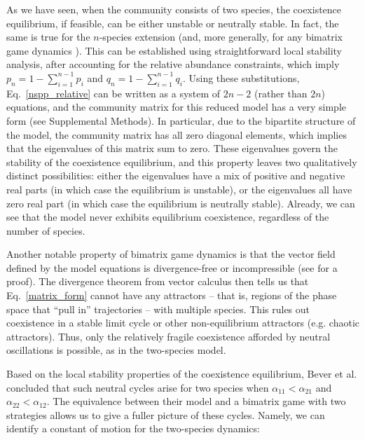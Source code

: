 \documentclass[11pt]{article}
\begin{document}
As we have seen, when the community consists of two species, the coexistence equilibrium, if feasible, can be either unstable or neutrally stable. In fact, the same is true for the $n$-species extension (and, more generally, for any bimatrix game dynamics \citep{eshel1983coevolutionary,selten1988note,hofbauer1998evolutionary}). This can be established using straightforward local stability analysis, after accounting for the relative abundance constraints, which imply $p_n = 1 - \sum_{i = 1}^{n-1} p_i$ and $q_n = 1 - \sum_{i = 1}^{n-1} q_i$. Using these substitutions, Eq.~\ref{nspp_relative} can be written as a system of $2 n - 2$ (rather than $2 n$) equations, and the community matrix for this reduced model has a very simple form (see Supplemental Methods). In particular, due to the bipartite structure of the model, the community matrix has all zero diagonal elements, which implies that the eigenvalues of this matrix sum to zero. These eigenvalues govern the stability of the coexistence equilibrium, and this property leaves two qualitatively distinct possibilities: either the eigenvalues have a mix of positive and negative real parts (in which case the equilibrium is unstable), or the eigenvalues all have zero real part (in which case the equilibrium is neutrally stable). Already, we can see that the model never exhibits equilibrium coexistence, regardless of the number of species.

Another notable property of bimatrix game dynamics is that the vector field defined by the model equations is divergence-free or incompressible (see \citep{hofbauer1998evolutionary} for a proof). The divergence theorem from vector calculus \citep{arfken1985mathematical} then tells us that Eq.~\ref{matrix_form} cannot have any attractors -- that is, regions of the phase space that ``pull in'' trajectories -- with multiple species. This rules out coexistence in a stable limit cycle or other non-equilibrium attractors (e.g. chaotic attractors). Thus, only the relatively fragile coexistence afforded by neutral oscillations is possible, as in the two-species model.

Based on the local stability properties of the coexistence equilibrium, Bever et al. concluded that such neutral cycles arise for two species when $\alpha_{11} < \alpha_{21}$ and $\alpha_{22} < \alpha_{12}$. The equivalence between their model and a bimatrix game with two strategies allows us to give a fuller picture of these cycles. Namely, we can identify a constant of motion for the two-species dynamics:
\end{document}
